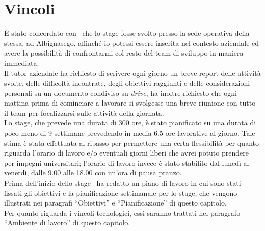 \section{Vincoli}
È stato concordato con \TS\ che lo stage fosse svolto presso la sede operativa della stessa, ad Albignasego, affinché io potessi essere inserita nel contesto aziendale ed avere la possibilità di confrontarmi col resto del team di sviluppo in maniera immediata. \\
Il tutor aziendale ha richiesto di scrivere ogni giorno un breve report delle attività svolte, delle difficoltà incontrate, degli obiettivi raggiunti e delle considerazioni personali su un documento condiviso su \emph{\gls{drive}}\glsfirstoccur, ha inoltre richiesto che ogni mattina prima di cominciare a lavorare si svolgesse una breve riunione con tutto il team per focalizzarsi sulle attività della giornata.\\
Lo stage, che prevede una durata di 300 ore, è stato pianificato su una durata di poco meno di 9 settimane prevedendo in media 6.5 ore lavorative al giorno. Tale stima è stata effettuata al ribasso per permettere una certa flessibilità per quanto riguarda l'orario di lavoro e/o eventuali giorni liberi che avrei potuto prendere per impegni universitari; l'orario di lavoro invece è stato stabilito dal lunedì al venerdì, dalle 9.00 alle 18.00 con un'ora di pausa pranzo. \\
Prima dell'inizio dello stage \TS\ ha redatto un piano di lavoro in cui sono stati fissati gli obiettivi e la pianificazione settimanale per lo stage, che vengono illustrati nei paragrafi ``Obiettivi'' e ``Pianificazione'' di questo capitolo. \\
Per quanto riguarda i vincoli tecnologici, essi saranno trattati nel paragrafo ``Ambiente di lavoro'' di questo capitolo.
